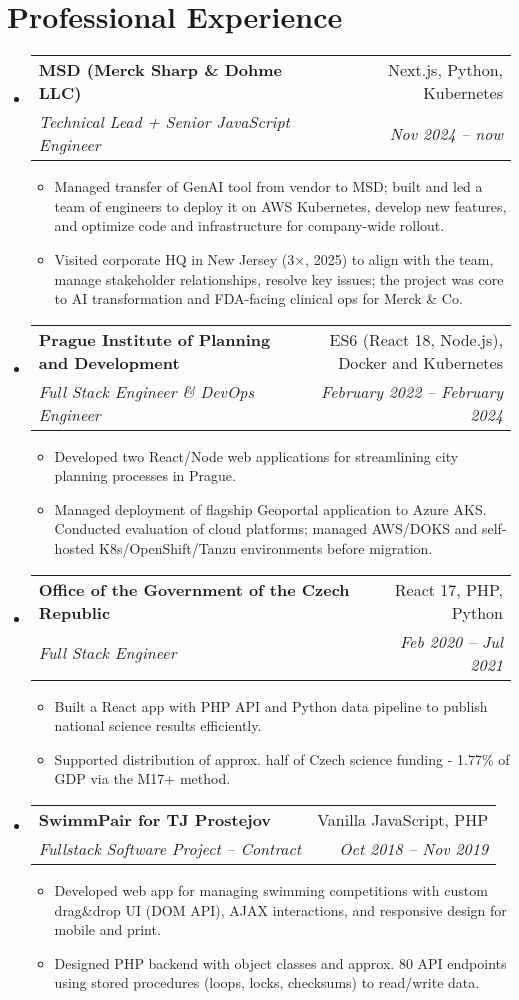 \documentclass[letterpaper,11pt]{article}
\makeatletter
\newcommand{\sitem}[1]{\item #1 \vspace{-2pt}}
\newcommand{\resumeSubheading}[4]{
  \vspace{-1pt}\item
    \begin{tabular*}{0.97\textwidth}[t]{l@{\extracolsep{\fill}}r}
      \textbf{#1} & #2 \\
      \textit{\small#3} & \textit{\small #4} \\
    \end{tabular*}\vspace{-5pt}
}
\newenvironment{subheadingListing}{\begin{itemize}[leftmargin=*]}{\end{itemize}}
\newenvironment{resumeList}{\begin{itemize}}{\end{itemize}\vspace{-5pt}}
\makeatother
\begin{document}
\section{Professional Experience}
\begin{subheadingListing}
  \resumeSubheading
  {MSD (Merck Sharp \& Dohme LLC)}{Next.js, Python, Kubernetes}
  { Technical Lead + Senior JavaScript Engineer}{Nov 2024 – now}
  \begin{resumeList}
    \sitem{Managed transfer of GenAI tool from vendor to MSD; built and led a team of engineers to deploy it on AWS Kubernetes, develop new features, and optimize code and infrastructure for company-wide rollout.}
    \sitem{Visited corporate HQ in New Jersey (3×, 2025) to align with the team, manage stakeholder relationships, resolve key issues; the project was core to AI transformation and FDA-facing clinical ops for Merck \& Co.}
  \end{resumeList}

  \resumeSubheading
  {Prague Institute of Planning and Development}{ES6 (React 18, Node.js), Docker and Kubernetes}
  {Full Stack Engineer \& DevOps Engineer}{February 2022 – February 2024}
  \begin{resumeList}
    \sitem{Developed two React/Node web applications for streamlining city planning processes in Prague.}
    \sitem{Managed deployment of flagship Geoportal application to Azure AKS. Conducted evaluation of cloud platforms; managed AWS/DOKS and self-hosted K8s/OpenShift/Tanzu environments before migration.}
  \end{resumeList}

  \resumeSubheading
    {Office of the Government of the Czech Republic}{React 17, PHP, Python}
    {Full Stack Engineer}{Feb 2020 – Jul 2021}
    \begin{resumeList}
      \sitem{Built a React app with PHP API and Python data pipeline to publish national science results efficiently.}
      \sitem{Supported distribution of approx. half of Czech science funding - 1.77\% of GDP via the M17+ method.}
    \end{resumeList}

\resumeSubheading
{SwimmPair for TJ Prostejov}{Vanilla JavaScript, PHP}
{Fullstack Software Project – Contract}{Oct 2018 – Nov 2019}
\begin{resumeList}
  \sitem{Developed web app for managing swimming competitions with custom drag\&drop UI (DOM API), AJAX interactions, and responsive design for mobile and print.}
  \sitem{Designed PHP backend with object classes and approx. 80 API endpoints using stored procedures (loops, locks, checksums) to read/write data.}
\end{resumeList}



\end{subheadingListing}
\end{document}
